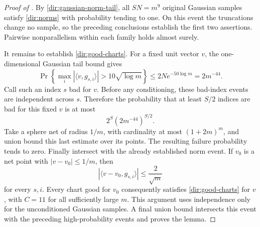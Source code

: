 \begin{proof}[Proof of ]
By \eqref{dir:gaussian-norm-tail}, all $SN=m^9$ original Gaussian samples
satisfy \eqref{dir:norms} with probability tending to one.  On this event
the truncations change no sample, so the preceding conclusions establish
the first two assertions.  Pairwise nonparallelism within each family holds
almost surely.

It remains to establish \eqref{dir:good-charts}.  For a fixed unit vector
$v$, the one-dimensional Gaussian tail bound gives
\[
 \Pr\left\{\max_i|\langle v,g_{s,i}\rangle|
                      >10\sqrt{\log m}\right\}
 \le 2N e^{-50\log m}=2m^{-44}.
\]
Call such an index $s$ bad for $v$.  Before any conditioning, these bad-index
events are independent across $s$.  Therefore the probability that at least
$S/2$ indices are bad for this fixed $v$ is at most
\[
 2^{S}(2m^{-44})^{S/2}.
\]
Take a sphere net of radius $1/m$, with cardinality at most $(1+2m)^m$,
and union bound this last estimate over its points.  The resulting failure
probability tends to zero.  Finally intersect with the already established
norm event.  If $v_0$ is a net point with $|v-v_0|\le1/m$, then
\[
 |\langle v-v_0,g_{s,i}\rangle|\le\frac2{\sqrt m}
\]
for every $s,i$.  Every chart good for $v_0$ consequently satisfies
\eqref{dir:good-charts} for $v$, with $C=11$ for all sufficiently large
$m$.  This argument uses independence only for the unconditioned Gaussian
samples.  A final union bound intersects this event with the preceding
high-probability events and proves the lemma.
\end{proof}
